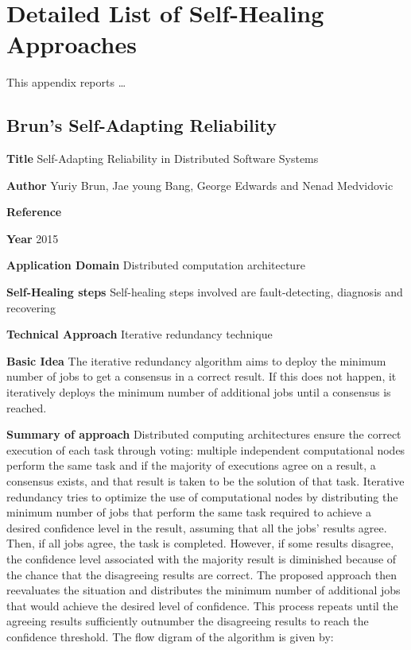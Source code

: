 \appendix
\chapter{Detailed List of Self-Healing Approaches}
\label{ap:approches}

This appendix reports \ldots 

\section{Brun's Self-Adapting Reliability} \label{ap:BurnSelf}
\begin{compactitem}
\item[\textbf{Title}]Self-Adapting Reliability in Distributed Software Systems
\item[\textbf{Author}] 
Yuriy Brun, Jae young Bang, George Edwards and Nenad Medvidovic
\item[\textbf{Reference}] 
\cite{brun_self-adapting_2015}
\item[\textbf{Year}] 
2015
\item[\textbf{Application Domain}] 
Distributed computation architecture
\item[\textbf{Self-Healing steps}] Self-healing steps involved are fault-detecting, diagnosis and recovering
\item[\textbf{Technical Approach}]Iterative redundancy technique
\item[\textbf{Basic Idea}] 
The iterative redundancy algorithm aims to deploy the minimum number of jobs to get a consensus in a correct result. If this does not happen, it iteratively deploys the minimum number of additional jobs until a consensus is reached. 

\item[\textbf{Summary of approach}]
Distributed computing architectures ensure the correct execution of each task through voting: multiple independent computational nodes perform the same task and if the majority of executions agree on a result, a consensus exists, and that result is taken to be the solution of that task. Iterative redundancy tries to optimize the use of computational nodes by distributing the minimum number of jobs that perform the same task required to achieve a desired confidence level in the result, assuming that all the jobs’ results agree. Then, if all jobs agree, the task is completed. However, if some results disagree, the confidence level associated with the majority result is diminished because of the chance that the disagreeing results are correct. The proposed approach then reevaluates the situation and distributes the minimum number of additional jobs that would achieve the desired level of confidence. This process repeats until the agreeing results sufficiently outnumber the disagreeing results to reach the confidence threshold. The flow digram of the algorithm is given by:


\end{compactitem}
